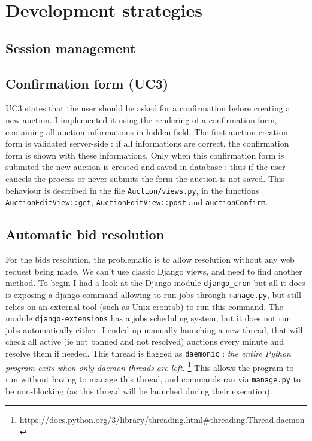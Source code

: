 \documentclass[a4paper, 11pt]{report}
\begin{document}
\chapter{Development strategies}

    \section{Session management}

    \section{Confirmation form (UC3)}

    UC3 states that the user should be asked for a confirmation before creating a new auction. I implemented it using the rendering of a confirmation form, containing all auction informations in hidden field. The first auction creation form is validated server-side : if all informations are correct, the confirmation form is shown with these informations. Only when this confirmation form is submited the new auction is created and saved in database : thus if the user cancels the process or never submits the form the auction is not saved. This behaviour is described in the file \texttt{Auction/views.py}, in the functions \texttt{AuctionEditView::get}, \texttt{AuctionEditView::post} and \texttt{auctionConfirm}. 

    \section{Automatic bid resolution}

    For the bids resolution, the problematic is to allow resolution without any web request being made. We can't use classic Django views, and need to find another method. To begin I had a look at the Django module \texttt{django\_cron} but all it does is exposing a django command allowing to run jobs through \texttt{manage.py}, but still relies on an external tool (such as Unix crontab) to run this command. The module \texttt{django-extensions} has a jobs scheduling system, but it does not run jobs automatically either. I ended up manually launching a new thread, that will check all active (ie not banned and not resolved) auctions every minute and resolve them if needed. This thread is flagged as \texttt{daemonic} : \textit{the entire Python program exits when only daemon threads are left. }\footnote{https://docs.python.org/3/library/threading.html\#threading.Thread.daemon} This allows the program to run without having to manage this thread, and commands ran via \texttt{manage.py} to be non-blocking (as this thread will be launched during their execution). 
\end{document}
